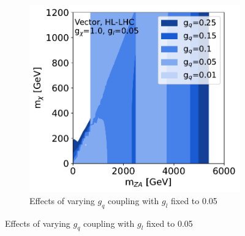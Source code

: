 \documentclass[11pt]{article}
\begin{document}
\begin{figure}
\begin{subfigure}[b]{0.49\textwidth}
         \includegraphics[width=\textwidth]{SummaryPlots-EF10/figures/massmass/hl-lhc/massmass_vector_gl0.05_gdm1.0.pdf}
         \caption{Effects of varying $g_q$ coupling with $g_l$ fixed to 0.05}
         \label{subfig:vector-hl-lhc-gqvariations2}
     \end{subfigure}


\end{figure}
\end{document}
